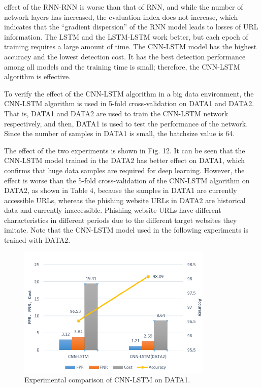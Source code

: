 \documentclass{ieeeaccess}
\begin{document}
effect of the RNN-RNN is worse than that of RNN, and while
the number of network layers has increased, the evaluation
index does not increase, which indicates that the ``gradient
dispersion'' of the RNN model leads to losses of URL information.
The LSTM and the LSTM-LSTM work better, but each epoch of training requires a large amount of time. The CNN-LSTM model has the highest accuracy and the lowest
detection cost. It has the best detection performance among
all models and the training time is small; therefore, the
CNN-LSTM algorithm is effective.
\par To verify the effect of the CNN-LSTM algorithm in a
big data environment, the CNN-LSTM algorithm is used in 5-fold cross-validation on DATA1 and DATA2. That is, DATA1 and DATA2 are used to train the CNN-LSTM network
respectively, and then, DATA1 is used to test the performance of the network. Since the number of samples in DATA1 is small, the batchsize value is 64.
\par The effect of the two experiments is shown in Fig. 12. It can
be seen that the CNN-LSTM model trained in the DATA2 has better effect on DATA1, which confirms that huge data samples are required for deep learning. However, the effect is worse than the 5-fold cross-validation of the CNN-LSTM algorithm on DATA2, as shown in Table 4, because the samples in DATA1 are currently accessible URLs, whereas the phishing website URLs in DATA2 are historical data and currently inaccessible. Phishing website URLs have different characteristics in different periods due to the different target websites they imitate. Note that the CNN-LSTM model used in the following experiments is trained with DATA2.

\begin{figure}
    \centering
    \includegraphics[width=\linewidth]{figure12.png}
    \caption{Experimental comparison of CNN-LSTM on DATA1.}
    \label{fig:12}
\end{figure}
\end{document}

